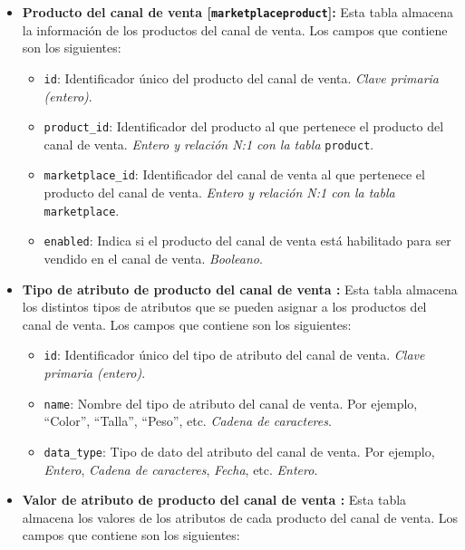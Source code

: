 \begin{itemize}
\begin{itemize}
          \end{itemize}
    \item \textbf{Producto del canal de venta [\texttt{marketplaceproduct}]:} Esta tabla almacena la información de los productos del canal de venta. Los campos que contiene son los siguientes:
          \begin{itemize}
              \item \texttt{id}: Identificador único del producto del canal de venta. \textit{Clave primaria (entero)}.
              \item \texttt{product\_id}: Identificador del producto al que pertenece el producto del canal de venta. \textit{Entero y relación N:1 con la tabla} \texttt{product}.
              \item \texttt{marketplace\_id}: Identificador del canal de venta al que pertenece el producto del canal de venta. \textit{Entero y relación N:1 con la tabla} \texttt{marketplace}.
              \item \texttt{enabled}: Indica si el producto del canal de venta está habilitado para ser vendido en el canal de venta. \textit{Booleano}.
          \end{itemize}
    \item \textbf{Tipo de atributo de producto del canal de venta :} Esta tabla almacena los distintos tipos de atributos que se pueden asignar a los productos del canal de venta. Los campos que contiene son los siguientes:
          \begin{itemize}
              \item \texttt{id}: Identificador único del tipo de atributo del canal de venta. \textit{Clave primaria (entero)}.
              \item \texttt{name}: Nombre del tipo de atributo del canal de venta. Por ejemplo, ``Color'', ``Talla'', ``Peso'', etc. \textit{Cadena de caracteres}.
              \item \texttt{data\_type}: Tipo de dato del atributo del canal de venta. Por ejemplo, \textit{Entero}, \textit{Cadena de caracteres}, \textit{Fecha}, etc. \textit{Entero}.
          \end{itemize}
    \item \textbf{Valor de atributo de producto del canal de venta :} Esta tabla almacena los valores de los atributos de cada producto del canal de venta. Los campos que contiene son los siguientes:

\end{itemize}
